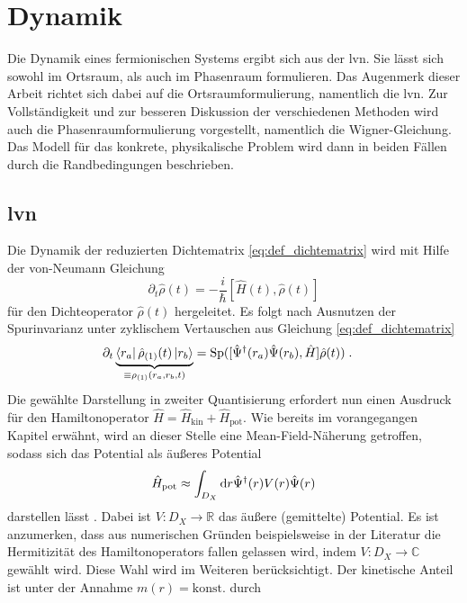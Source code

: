 \section{Dynamik} \label{sec:dynamik}
Die Dynamik eines fermionischen Systems ergibt sich aus der \ac{lvn}. Sie lässt sich sowohl im Ortsraum, als auch im Phasenraum formulieren. Das Augenmerk dieser Arbeit richtet sich dabei auf die Ortsraumformulierung, namentlich die \ac{lvn}. Zur Vollständigkeit und zur besseren Diskussion der verschiedenen Methoden wird auch die Phasenraumformulierung vorgestellt, namentlich die Wigner-Gleichung. Das Modell für das konkrete, physikalische Problem wird dann in beiden Fällen durch die Randbedingungen beschrieben.

\subsection{\ac{lvn}}
Die Dynamik der reduzierten Dichtematrix \eqref{eq:def_dichtematrix} wird mit Hilfe der von-Neumann Gleichung
\begin{equation*}
    \partial_t \hat{\rho}(t) = - \frac{i}{\hbar}[\hat{H}(t), \hat{\rho}(t)]
\end{equation*}
für den Dichteoperator $\hat{\rho}(t)$ hergeleitet. Es folgt nach Ausnutzen der Spurinvarianz unter zyklischem Vertauschen aus Gleichung \eqref{eq:def_dichtematrix}
\begin{align}
  \partial_t \underbrace{\bra{{r_a}}\hat{\rho}_{(1)}(t) \ket{{r_b}}}_{\equiv \rho_{(1)}({r_a},{r_b},t)} &= \text{Sp}([\hat{\Psi}^{\dagger}({r_a})\hat{\Psi}({r_b}),\hat{H}]\hat{\rho}(t)) \; .
  \label{eq:dichtematrix}
\end{align}
Die gewählte Darstellung in zweiter Quantisierung erfordert nun einen Ausdruck für den Hamiltonoperator ${\hat{H}=\hat{H}_{\text{kin}} + \hat{H}_{\text{pot}}}$. Wie bereits im vorangegangen Kapitel erwähnt, wird an dieser Stelle eine Mean-Field-Näherung getroffen, sodass sich das Potential als äußeres Potential
\begin{equation}
    \hat{H}_{\text{pot}} \approx \int_{D_X} \mathop{}\!\mathrm{d} r \hat{\Psi}^{\dagger}(r)V(r)\hat{\Psi}(r)
    \label{eq:Hpot}
\end{equation}
darstellen lässt \cite{modern}. Dabei ist ${V: D_X \rightarrow \mathbb{R}}$ das äußere (gemittelte) Potential. Es ist anzumerken, dass aus numerischen Gründen beispielsweise in der Literatur \cite{lukas1} die Hermitizität des Hamiltonoperators fallen gelassen wird, indem ${V: D_X \rightarrow \mathbb{C}}$ gewählt wird. Diese Wahl wird im Weiteren berücksichtigt. Der kinetische Anteil ist unter der Annahme ${m(r)=\text{konst.}}$ durch

